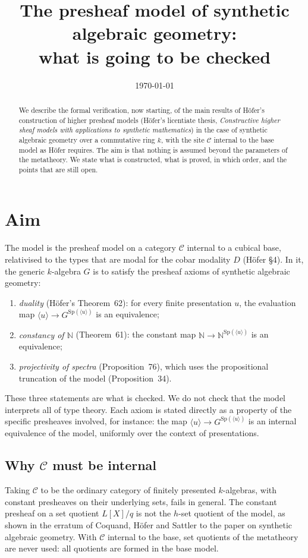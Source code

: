 \documentclass[11pt]{amsart}
\title{The presheaf model of synthetic algebraic geometry:\\ what is going to be checked}
\date{\today}
\theoremstyle{definition}
\theoremstyle{remark}
\newcommand{\Sp}{\mathrm{Sp}}
\newcommand{\pres}[1]{\langle #1\rangle}
\begin{document}
\maketitle

\begin{abstract}
We describe the formal verification, now starting, of the main results of
H\"ofer's construction of higher presheaf models (H\"ofer's licentiate
thesis, \emph{Constructive higher sheaf models with applications to
synthetic mathematics}) in the case of synthetic algebraic geometry over a
commutative ring $k$, with the site $\mathcal C$ internal to the base model
as H\"ofer requires. The aim is that nothing is assumed beyond the
parameters of the metatheory. We state what is constructed, what is
proved, in which order, and the points that are still open.
\end{abstract}

\section{Aim}

The model is the presheaf model on a category $\mathcal C$ internal to a
cubical base, relativised to the types that are modal for the cobar
modality $D$ (H\"ofer \S4). In it, the generic $k$-algebra $G$ is to satisfy
the presheaf axioms of synthetic algebraic geometry:

\begin{enumerate}[label=(\arabic*)]
\item \emph{duality} (H\"ofer's Theorem~62): for every finite presentation
$u$, the evaluation map $\pres u \to G^{\Sp(\pres u)}$ is an equivalence;
\item \emph{constancy of $\mathbb N$} (Theorem~61): the constant map
$\mathbb N\to\mathbb N^{\Sp(\pres u)}$ is an equivalence;
\item \emph{projectivity of spectra} (Proposition~76), which uses the
propositional truncation of the model (Proposition~34).
\end{enumerate}

These three statements are what is checked. We do not check that the model
interprets all of type theory. Each axiom is stated directly as a property
of the specific presheaves involved, for instance: the map
$\pres u\to G^{\Sp(\pres u)}$ is an internal equivalence of the model,
uniformly over the context of presentations.

\subsection*{Why $\mathcal C$ must be internal}
Taking $\mathcal C$ to be the ordinary category of finitely presented
$k$-algebras, with constant presheaves on their underlying sets, fails in
general. The constant presheaf on a set quotient $L[X]/q$ is not the
$h$-set quotient of the model, as shown in the erratum of Coquand, H\"ofer
and Sattler to the paper on synthetic algebraic geometry. With
$\mathcal C$ internal to the base, set quotients of the metatheory are
never used: all quotients are formed in the base model.
\end{document}
